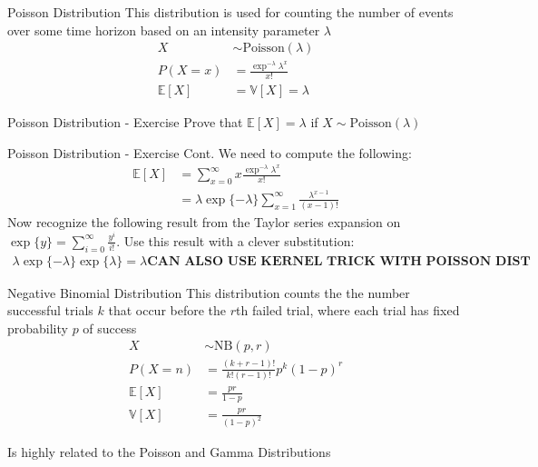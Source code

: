\documentclass{beamer}
\begin{document}
\begin{frame}{Poisson Distribution}
This distribution is used for counting the number of events over some time horizon based on an intensity parameter $\lambda$
\begin{align*}
X &\sim \mathrm{Poisson}(\lambda)\\
P(X = x) &= \frac{\exp^{-\lambda}\lambda^{x}}{x!}\\
\mathbb{E}[X] &= \mathbb{V}[X] = \lambda
\end{align*}
\end{frame}

\begin{frame}{Poisson Distribution - Exercise}
Prove that $\mathbb{E}[X] = \lambda$ if $X\sim\mathrm{Poisson}(\lambda)$
\end{frame}

\begin{frame}{Poisson Distribution - Exercise Cont.}
We need to compute the following:
\begin{align*}
\mathbb{E}[X] &= \sum_{x = 0}^{\infty}x \frac{\exp^{-\lambda}\lambda^{x}}{x!} \\
&= \lambda \exp\{-\lambda\} \sum_{x = 1}^{\infty}\frac{\lambda^{x-1}}{(x-1)!} 
\end{align*}
Now recognize the following result from the Taylor series expansion on $\exp\{y\} = \sum_{i=0}^{\infty}\frac{y^{i}}{i!}$. Use this result with a clever substitution:
\begin{align*}
\lambda \exp\{-\lambda\} \exp\{\lambda\} = \lambda

\textbf{CAN ALSO USE KERNEL TRICK WITH POISSON DIST}

\end{align*}
\end{frame}

\begin{frame}{Negative Binomial Distribution}
This distribution counts the the number successful trials $k$ that occur before the $r$th failed trial, where each trial has fixed probability $p$ of success
\begin{align*}
X &\sim \mathrm{NB}(p, r) \\
P(X  = n) &= \frac{(k+r - 1)!}{k!(r-1)!} p^{k}(1-p)^{r} \\
\mathbb{E}[X] &= \frac{pr}{1-p} \\
\mathbb{V}[X] &= \frac{p r}{(1-p)^2}
\end{align*}

Is highly related to the Poisson and Gamma Distributions
\end{frame}
\end{document}
